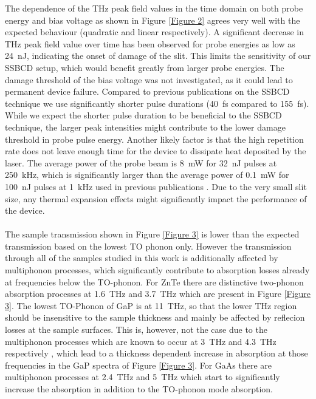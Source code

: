 \documentclass{article}
\begin{document}
The dependence of the THz peak field values in the time domain on both probe energy and bias voltage as shown in Figure \ref{Figure 2} agrees very well with the expected behaviour (quadratic and linear respectively). A significant decrease in THz peak field value over time has been observed for probe energies as low as \mbox{24 nJ}, indicating the onset of damage of the slit. This limits the sensitivity of our SSBCD setup, which would benefit greatly from larger probe energies. The damage threshold of the bias voltage was not investigated, as it could lead to permanent device failure. Compared to previous publications on the SSBCD technique \cite{tomasino-2017, tomasino-2018, tomasino-2021} we use significantly shorter pulse durations (\mbox{40 fs} compared to \mbox{155 fs}). While we expect the shorter pulse duration to be beneficial to the \mbox{SSBCD} technique, the larger peak intensities might contribute to the lower damage threshold in probe pulse energy. Another likely factor is that the high repetition rate does not leave enough time for the device to dissipate heat deposited by the laser. The average power of the probe beam is \mbox{8 mW} for \mbox{32 nJ} pulses at \mbox{250 kHz}, which is significantly larger than the average power of \mbox{0.1 mW} for \mbox{100 nJ} pulses at \mbox{1 kHz} used in previous publications \cite{tomasino-2017, tomasino-2018, tomasino-2021}. Due to the very small slit size, any thermal expansion effects might significantly impact the performance of the device.
\\~\\
The sample transmission shown in Figure \ref{Figure 3} is lower than the expected transmission based on the lowest TO phonon only. However the transmission through all of the samples studied in this work is additionally affected by multiphonon processes, which significantly contribute to absorption losses already at frequencies below the TO-phonon. For ZnTe there are distinctive two-phonon absorption processes at \mbox{1.6 THz} and \mbox{3.7 THz} \cite{lee-2008} which are present in Figure \ref{Figure 3}. The lowest TO-Phonon of GaP is at \mbox{11 THz}, so that the lower THz region should be insensitive to the sample thickness and mainly be affected by reflecion losses at the sample surfaces. This is, however, not the case due to the multiphonon processes which are known to occur at \mbox{3 THz} and \mbox{4.3 THz} respectively \cite{saito-2008}, which lead to a thickness dependent increase in absorption at those frequencies in the GaP spectra of Figure \ref{Figure 3}. For GaAs there are multiphonon processes at \mbox{2.4 THz} and \mbox{5 THz} \cite{stolen-1969} which start to significantly increase the absorption in addition to the TO-phonon mode absorption.  
\end{document}
